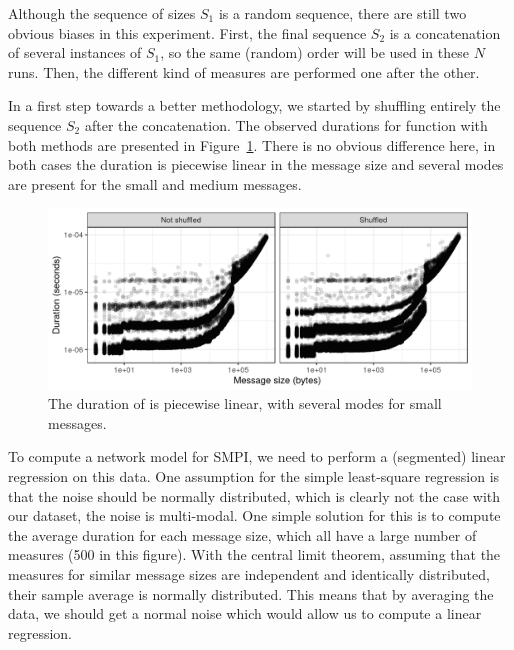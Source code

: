         Although the sequence of sizes \(S_1\) is a random sequence, there are still two obvious biases in this
        experiment.  First, the final sequence \(S_2\) is a concatenation of several instances of \(S_1\), so the same
        (random) order will be used in these \(N\) runs. Then, the different kind of measures are performed one after
        the other.

        In a first step towards a better methodology, we started by shuffling entirely the sequence \(S_2\) after the
        concatenation. The observed durations for function \recv with both methods are presented in
        Figure~\ref{fig:randomizing_order:raw_data}. There is no obvious difference here, in both cases the duration is
        piecewise linear in the message size and several modes are present for the small and medium messages.

        \begin{figure}[htpb]
            \centering
            \includegraphics[width=\linewidth]{img/experiment/randomizing_order/raw_data.png}
            \caption{The duration of \recv is piecewise linear, with several modes for small messages.}%
            \label{fig:randomizing_order:raw_data}
        \end{figure}

        To compute a network model for SMPI, we need to perform a (segmented) linear regression on this data. One
        assumption for the simple least-square regression is that the noise should be normally distributed, which is
        clearly not the case with our dataset, the noise is multi-modal. One simple solution for this is to compute the
        average duration for each message size, which all have a large number of measures (500 in this figure). With the
        central limit theorem, assuming that the measures for similar message sizes are independent and identically
        distributed, their sample average is normally distributed. This means that by averaging the data, we should get a
        normal noise which would allow us to compute a linear regression.

